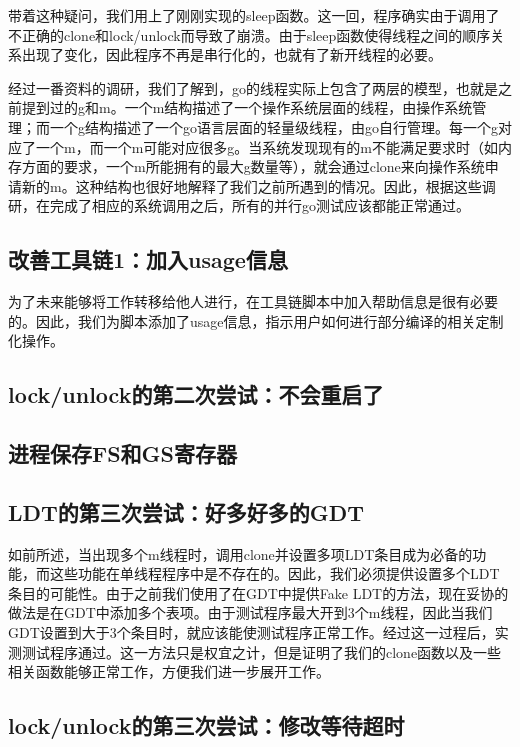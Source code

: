 \documentclass{article}
\begin{document}
带着这种疑问，我们用上了刚刚实现的sleep函数。这一回，程序确实由于调用了不正确的clone和lock/unlock而导致了崩溃。由于sleep函数使得线程之间的顺序关系出现了变化，因此程序不再是串行化的，也就有了新开线程的必要。

经过一番资料的调研，我们了解到，go的线程实际上包含了两层的模型，也就是之前提到过的g和m。一个m结构描述了一个操作系统层面的线程，由操作系统管理；而一个g结构描述了一个go语言层面的轻量级线程，由go自行管理。每一个g对应了一个m，而一个m可能对应很多g。当系统发现现有的m不能满足要求时（如内存方面的要求，一个m所能拥有的最大g数量等），就会通过clone来向操作系统申请新的m。这种结构也很好地解释了我们之前所遇到的情况。因此，根据这些调研，在完成了相应的系统调用之后，所有的并行go测试应该都能正常通过。

\subsection{改善工具链1：加入usage信息}
为了未来能够将工作转移给他人进行，在工具链脚本中加入帮助信息是很有必要的。因此，我们为脚本添加了usage信息，指示用户如何进行部分编译的相关定制化操作。

\subsection{lock/unlock的第二次尝试：不会重启了}

\subsection{进程保存FS和GS寄存器}

\subsection{LDT的第三次尝试：好多好多的GDT}
如前所述，当出现多个m线程时，调用clone并设置多项LDT条目成为必备的功能，而这些功能在单线程程序中是不存在的。因此，我们必须提供设置多个LDT条目的可能性。由于之前我们使用了在GDT中提供Fake LDT的方法，现在妥协的做法是在GDT中添加多个表项。由于测试程序最大开到3个m线程，因此当我们GDT设置到大于3个条目时，就应该能使测试程序正常工作。经过这一过程后，实测测试程序通过。这一方法只是权宜之计，但是证明了我们的clone函数以及一些相关函数能够正常工作，方便我们进一步展开工作。

\subsection{lock/unlock的第三次尝试：修改等待超时}
\end{document}
